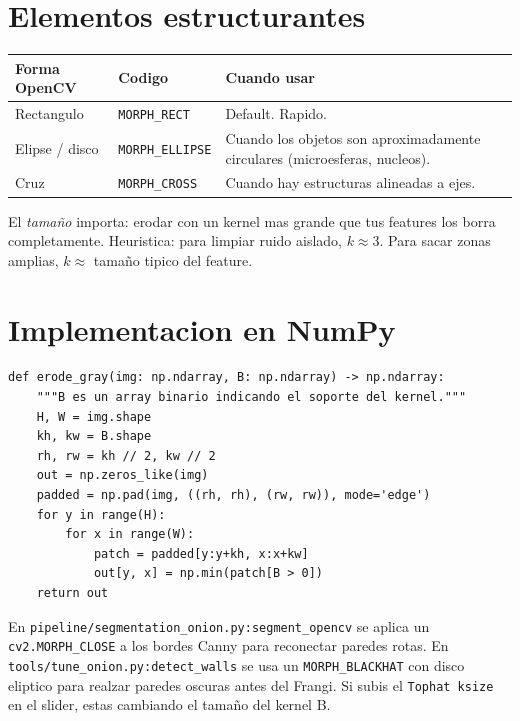 \documentclass[11pt,a4paper,twoside,openright]{book}
\begin{document}
\section{Elementos estructurantes}

\begin{center}
\begin{tabular}{@{}llp{6cm}@{}}
\toprule
\textbf{Forma OpenCV} & \textbf{Codigo} & \textbf{Cuando usar} \\
\midrule
Rectangulo & \texttt{MORPH\_RECT} & Default. Rapido. \\
Elipse / disco & \texttt{MORPH\_ELLIPSE} & Cuando los objetos son aproximadamente circulares (microesferas, nucleos). \\
Cruz & \texttt{MORPH\_CROSS} & Cuando hay estructuras alineadas a ejes. \\
\bottomrule
\end{tabular}
\end{center}

El \emph{tamaño} importa: erodar con un kernel mas grande que tus features los borra completamente. Heuristica: para limpiar ruido aislado, $k \approx 3$. Para sacar zonas amplias, $k \approx$ tamaño tipico del feature.

\section{Implementacion en NumPy}

\begin{lstlisting}[caption={Erosion grayscale desde cero.}]
def erode_gray(img: np.ndarray, B: np.ndarray) -> np.ndarray:
    """B es un array binario indicando el soporte del kernel."""
    H, W = img.shape
    kh, kw = B.shape
    rh, rw = kh // 2, kw // 2
    out = np.zeros_like(img)
    padded = np.pad(img, ((rh, rh), (rw, rw)), mode='edge')
    for y in range(H):
        for x in range(W):
            patch = padded[y:y+kh, x:x+kw]
            out[y, x] = np.min(patch[B > 0])
    return out
\end{lstlisting}

\begin{pipeline}
En \texttt{pipeline/segmentation\_onion.py:segment\_opencv} se aplica un \texttt{cv2.MORPH\_CLOSE} a los bordes Canny para reconectar paredes rotas. En \texttt{tools/tune\_onion.py:detect\_walls} se usa un \texttt{MORPH\_BLACKHAT} con disco eliptico para realzar paredes oscuras antes del Frangi. Si subis el \texttt{Tophat ksize} en el slider, estas cambiando el tamaño del kernel B.
\end{pipeline}
\end{document}
